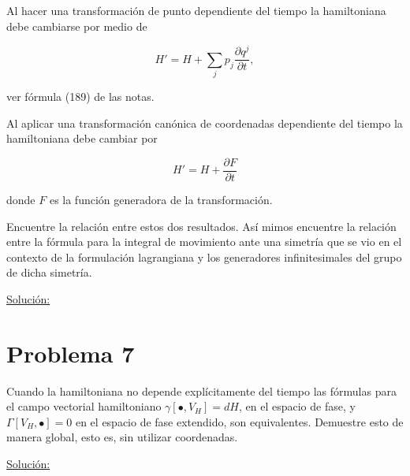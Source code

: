 \documentclass[a4paper,10pt]{article}
\numberwithin{equation}{section}
\begin{document}
Al hacer una transformación de punto dependiente del tiempo la hamiltoniana 
debe cambiarse por medio de 

$$
H' = H + \sum_j p_j \frac{\partial q^j}{\partial t},
$$

ver fórmula (189) de las notas.

\vspace{.3cm}

Al aplicar una transformación canónica de coordenadas dependiente del tiempo la 
hamiltoniana debe cambiar por 

$$
H' = H + \frac{\partial F}{\partial t}
$$

donde $F$ es la función generadora de la transformación. 

\vspace{.3cm}

Encuentre la relación entre estos dos resultados. Así mimos encuentre la relación 
entre la fórmula para la integral de movimiento ante una simetría que se vio en el 
contexto de la formulación lagrangiana y los generadores infinitesimales del grupo 
de dicha simetría.

\vspace{.3cm}

\underline{Solución:} \vspace{.3cm}

\section{Problema 7}

Cuando la hamiltoniana no depende explícitamente del tiempo las fórmulas para el 
campo vectorial hamiltoniano $\gamma[\bullet,V_H] = dH$, en el espacio de fase, 
y $\Gamma[V_H,\bullet] = 0$ en el espacio de fase extendido, son equivalentes. 
Demuestre esto de manera global, esto es, sin utilizar coordenadas.

\vspace{.3cm}

\underline{Solución:} \vspace{.3cm}
\end{document}
